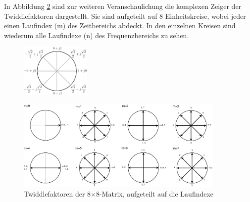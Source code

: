  In Abbildung \ref{pic:Twiddlefaktoren_Darstellung8x8} sind zur weiteren Veranschaulichung die komplexen Zeiger der Twiddlefaktoren dargestellt. Sie sind aufgeteilt auf 8 
 Einheitskreise, wobei jeder einen Laufindex (m) des Zeitbereichs abdeckt. In den einzelnen Kreisen sind wiederum alle Laufindexe (n) des Frequenzbereichs zu sehen.
 

 \begin{figure}[!t]
  \centering
  \includegraphics[width=0.3\textwidth]{img/Einheitskreis-crop.pdf}
  \label{pic:Einheitskreis}
\end{figure}
  
  

  


\begin{figure}[!ht]
 \centering
 \includegraphics[width=0.9\textwidth]{img/Twiddlefaktoren_Einheitskreis.eps}
 \caption{Twiddlefaktoren der 8$\times$8-Matrix, aufgeteilt auf die Laufindexe}
 \label{pic:Twiddlefaktoren_Darstellung8x8}
\end{figure}

\vspace{0.5cm}


 

